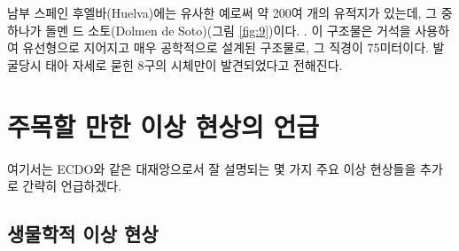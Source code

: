 \documentclass[10pt,twocolumn,letterpaper]{article}
\begin{document}
남부 스페인 후엘바(Huelva)에는 유사한 예로써 약 200여 개의 유적지가 있는데, 그 중 하나가 돌멘 드 소토(Dolmen de Soto)(그림 \ref{fig:9})이다. \cite{72,32}. 이 구조물은 거석을 사용하여 유선형으로 지어지고 매우 공학적으로 설계된 구조물로, 그 직경이 75미터이다. 발굴당시 태아 자세로 묻힌 8구의 시체만이 발견되었다고 전해진다.

\section{주목할 만한 이상 현상의 언급}

여기서는 ECDO와 같은 대재앙으로서  잘 설명되는 몇 가지 주요 이상 현상들을 추가로 간략히 언급하겠다.

\subsection{생물학적 이상 현상}
\end{document}
